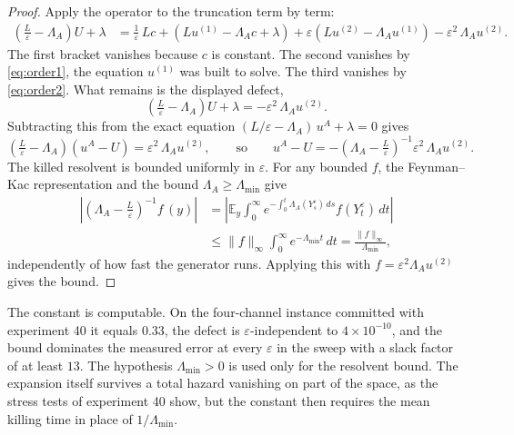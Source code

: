 \documentclass[11pt]{article}
\theoremstyle{remark}
\begin{document}
\begin{proof}
Apply the operator to the truncation term by term:
\begin{align*}
  \left(\tfrac{L}{\varepsilon} - \Lambda_A\right) U + \lambda
  &= \tfrac{1}{\varepsilon}\, L c
     + \left(L u^{(1)} - \Lambda_A c + \lambda\right)
     + \varepsilon \left(L u^{(2)} - \Lambda_A u^{(1)}\right)
     - \varepsilon^2\, \Lambda_A u^{(2)} .
\end{align*}
The first bracket vanishes because $c$ is constant. The second vanishes by
\eqref{eq:order1}, the equation $u^{(1)}$ was built to solve. The third
vanishes by \eqref{eq:order2}. What remains is the displayed defect,
\[
  \left(\tfrac{L}{\varepsilon} - \Lambda_A\right) U + \lambda
  = -\varepsilon^2\, \Lambda_A u^{(2)} .
\]
Subtracting this from the exact equation
$(L/\varepsilon - \Lambda_A)\,u^A + \lambda = 0$ gives
\[
  \left(\tfrac{L}{\varepsilon} - \Lambda_A\right)\!\left(u^A - U\right)
  = \varepsilon^2\, \Lambda_A u^{(2)},
  \qquad\text{so}\qquad
  u^A - U
  = -\left(\Lambda_A - \tfrac{L}{\varepsilon}\right)^{-1}
    \varepsilon^2\, \Lambda_A u^{(2)} .
\]
The killed resolvent is bounded uniformly in $\varepsilon$. For any bounded
$f$, the Feynman--Kac representation and the bound
$\Lambda_A \ge \Lambda_{\min}$ give
\begin{align*}
  \left|\left(\Lambda_A - \tfrac{L}{\varepsilon}\right)^{-1}
  f\,(y)\right|
  &= \left| \mathbb{E}_y \int_0^\infty
    e^{-\int_0^t \Lambda_A(Y^\varepsilon_s)\,ds}
    f(Y^\varepsilon_t)\, dt \right| \\
  &\le \|f\|_\infty \int_0^\infty e^{-\Lambda_{\min} t}\, dt
   = \frac{\|f\|_\infty}{\Lambda_{\min}} ,
\end{align*}
independently of how fast the generator runs. Applying this with
$f = \varepsilon^2 \Lambda_A u^{(2)}$ gives the bound.
\end{proof}

The constant is computable. On the four-channel instance committed with
experiment 40 it equals $0.33$, the defect is $\varepsilon$-independent to
$4\times10^{-10}$, and the bound dominates the measured error at every
$\varepsilon$ in the sweep with a slack factor of at least $13$. The hypothesis $\Lambda_{\min} > 0$ is
used only for the resolvent bound. The expansion itself survives a total
hazard vanishing on part of the space, as the stress tests of experiment 40
show, but the constant then requires the mean killing time in place of
$1/\Lambda_{\min}$.
\end{document}
